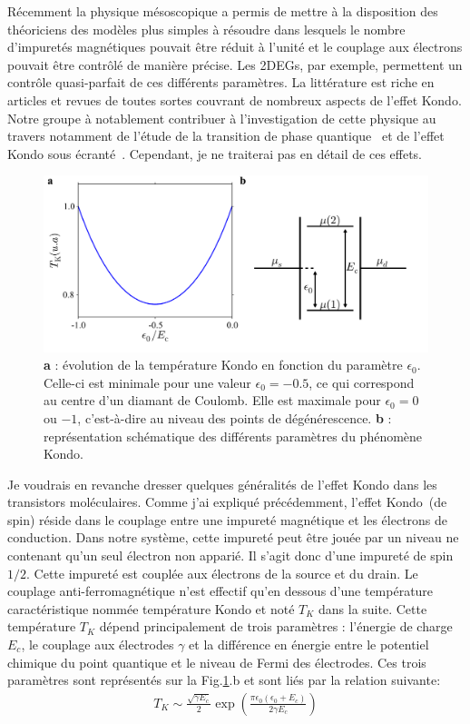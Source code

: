 Récemment la physique mésoscopique a permis de mettre à la disposition des théoriciens des modèles plus simples à résoudre dans lesquels le nombre d'impuretés magnétiques pouvait être réduit à l'unité et le couplage aux électrons pouvait être contrôlé de manière précise. Les 2DEGs, par exemple, permettent un contrôle quasi-parfait de ces différents paramètres. La littérature est riche en articles et revues de toutes sortes couvrant de nombreux aspects de l'effet Kondo. Notre groupe à notablement contribuer à l'investigation de cette physique au travers notamment de l'étude de la transition de phase quantique~\cite{Roch2008} et de l'effet Kondo sous écranté~\cite{Roch2009}. Cependant, je ne traiterai pas en détail de ces effets.

\begin{figure}
\includegraphics[scale=0.45]{Annexe2/figure6/figure6.pdf} 
\caption{\textbf{a} : évolution de la température Kondo en fonction du paramètre $\epsilon_0$. Celle-ci est minimale pour une valeur $\epsilon_0=-0.5$, ce qui correspond au centre d'un diamant de Coulomb. Elle est maximale pour $\epsilon_0=0$ ou $-1$, c'est-à-dire au niveau des points de dégénérescence. \textbf{b} : représentation schématique des différents paramètres du phénomène Kondo.}
\label{Kondo_param}
\end{figure}


Je voudrais en revanche dresser quelques généralités de l'effet Kondo dans les transistors moléculaires. Comme j'ai expliqué précédemment, l'effet Kondo~(de spin) réside dans le couplage entre une impureté magnétique et les électrons de conduction. Dans notre système, cette impureté peut être jouée par un niveau ne contenant qu'un seul électron non apparié. Il s'agit donc d'une impureté de spin $1/2$. Cette impureté est couplée aux électrons de la source et du drain. Le couplage anti-ferromagnétique n'est effectif qu'en dessous d'une température caractéristique nommée température Kondo et noté $T_K$ dans la suite. Cette température $T_K$ dépend principalement de trois paramètres : l'énergie de charge $E_c$, le couplage aux électrodes $\gamma$ et la différence en énergie entre le potentiel chimique du point quantique et le niveau de Fermi des électrodes. Ces trois paramètres sont représentés sur la Fig.\ref{Kondo_param}.b et sont liés par la relation suivante:
\begin{eqnarray}
T_K \sim \frac{\sqrt{\gamma E_c}}{2} \exp(\frac{\pi \epsilon_0(\epsilon_0 + E_c)}{2\gamma E_c})
\end{eqnarray}

